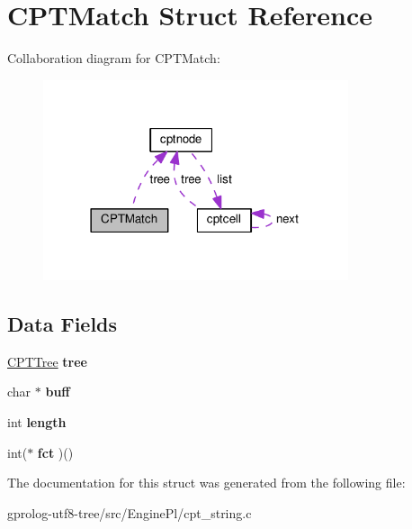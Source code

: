 \hypertarget{structCPTMatch}{}\section{C\+P\+T\+Match Struct Reference}
\label{structCPTMatch}


Collaboration diagram for C\+P\+T\+Match\+:\nopagebreak
\begin{figure}[H]
\begin{center}
\leavevmode
\includegraphics[width=254pt]{structCPTMatch__coll__graph}
\end{center}
\end{figure}
\subsection*{Data Fields}
\begin{DoxyCompactItemize}
\item 
\hyperlink{structcptnode}{C\+P\+T\+Tree} {\bfseries tree}\hypertarget{structCPTMatch_a11fa53acc2fd955cbea152f381e82f31}{}\label{structCPTMatch_a11fa53acc2fd955cbea152f381e82f31}

\item 
char $\ast$ {\bfseries buff}\hypertarget{structCPTMatch_a07b32173eb67b2c3e2918bf5a8d29ee5}{}\label{structCPTMatch_a07b32173eb67b2c3e2918bf5a8d29ee5}

\item 
int {\bfseries length}\hypertarget{structCPTMatch_aa6d88b8078ed95b080fd648bd46a67c9}{}\label{structCPTMatch_aa6d88b8078ed95b080fd648bd46a67c9}

\item 
int($\ast$ {\bfseries fct} )()\hypertarget{structCPTMatch_a1bee4a76898a1ef5809eb26af9d9673d}{}\label{structCPTMatch_a1bee4a76898a1ef5809eb26af9d9673d}

\end{DoxyCompactItemize}


The documentation for this struct was generated from the following file\+:\begin{DoxyCompactItemize}
\item 
gprolog-\/utf8-\/tree/src/\+Engine\+Pl/cpt\+\_\+string.\+c\end{DoxyCompactItemize}
